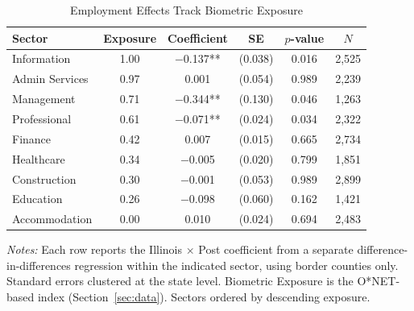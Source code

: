 \begin{table}[htbp]
\centering
\caption{Employment Effects Track Biometric Exposure}
\label{tab:sectors}
\begin{tabular}{lccccc}
\toprule
Sector & Exposure & Coefficient & SE & $p$-value & $N$ \\
\midrule
Information & 1.00 & $-$0.137** & (0.038) & 0.016 & 2,525 \\
Admin Services & 0.97 & 0.001 & (0.054) & 0.989 & 2,239 \\
Management & 0.71 & $-$0.344** & (0.130) & 0.046 & 1,263 \\
Professional & 0.61 & $-$0.071** & (0.024) & 0.034 & 2,322 \\
Finance & 0.42 & 0.007 & (0.015) & 0.665 & 2,734 \\
Healthcare & 0.34 & $-$0.005 & (0.020) & 0.799 & 1,851 \\
Construction & 0.30 & $-$0.001 & (0.053) & 0.989 & 2,899 \\
Education & 0.26 & $-$0.098 & (0.060) & 0.162 & 1,421 \\
Accommodation & 0.00 & 0.010 & (0.024) & 0.694 & 2,483 \\
\bottomrule
\end{tabular}
\begin{tablenotes}[flushleft]
\small
\item \textit{Notes:} Each row reports the Illinois $\times$ Post coefficient from a separate difference-in-differences regression within the indicated sector, using border counties only. Standard errors clustered at the state level. Biometric Exposure is the O*NET-based index (Section~\ref{sec:data}). Sectors ordered by descending exposure.
\end{tablenotes}
\end{table}

